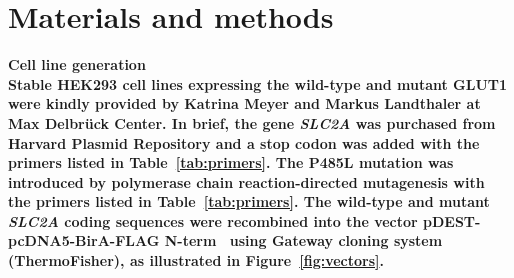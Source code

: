 
\chapter{Materials and methods} %
\label{Chapter2} %

\bfseries{Cell line generation}\\
\normalfont Stable HEK293 cell lines expressing the wild-type and mutant GLUT1 were kindly provided by Katrina Meyer and Markus Landthaler at Max Delbr\"{u}ck Center. In brief, the gene \textit{SLC2A} was purchased from Harvard Plasmid Repository and a stop codon was added with the primers listed in Table~\ref{tab:primers}. The P485L mutation was introduced by polymerase chain reaction-directed mutagenesis with the primers listed in Table~\ref{tab:primers}. The wild-type and mutant \textit{SLC2A} coding sequences were recombined into the vector pDEST-pcDNA5-BirA-FLAG N-term~\cite{Couzens} using Gateway cloning system (ThermoFisher), as illustrated in Figure~\ref{fig:vectors}. 

